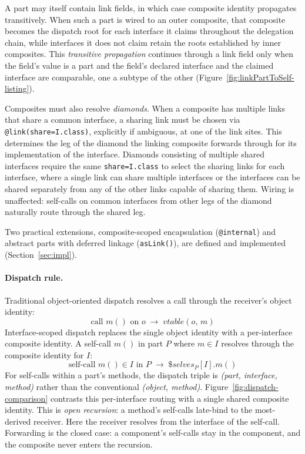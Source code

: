 \documentclass[acmsmall,nonacm]{acmart}
\theoremstyle{acmplain}
\newcommand{\code}[1]{\texttt{#1}}
\begin{document}
A part may itself contain link fields, in which case composite identity propagates transitively. When such a part is wired
to an outer composite, that composite becomes the dispatch root for each interface it claims throughout the delegation chain,
while interfaces it does not claim retain the roots established by inner composites. This \emph{transitive propagation}
continues through a link field only when the field's value is a part and the field's declared interface and the claimed
interface are comparable, one a subtype of the other (Figure~\ref{fig:linkPartToSelf-listing}).

Composites must also resolve \emph{diamonds}. When a composite has multiple links that share a common interface, a sharing
link must be chosen via \code{@link(share=I.class)}, explicitly if ambiguous, at one of the link sites. This determines the leg of the diamond the
linking composite forwards through for its implementation of the interface. Diamonds consisting of multiple shared interfaces require the same \code{share=I.class}
to select the sharing links for each interface, where a single link can share multiple interfaces or the interfaces
can be shared separately from any of the other links capable of sharing them. Wiring is unaffected: self-calls on common
interfaces from other legs of the diamond naturally route through the shared leg.

Two practical extensions, composite-scoped encapsulation (\code{@internal}) and abstract parts with deferred linkage (\code{asLink()}),
are defined and implemented (Section~\ref{sec:impl}).

\paragraph{Dispatch rule.}
Traditional object-oriented dispatch resolves a call through the receiver's object identity:
\[ \text{call } m() \text{ on } o \;\longrightarrow\; \mathit{vtable}(o,\, m) \]
Interface-scoped dispatch replaces the single object identity with a per-interface composite identity. A self-call $m()$
in part $P$ where $m \in I$ resolves through the composite identity for $I$:
\[ \text{self-call } m() \in I \text{ in } P \;\longrightarrow\; \$\mathit{selves}_P[I].m() \]
For self-calls within a part's methods, the dispatch triple is \emph{(part, interface, method)} rather than the conventional
\emph{(object, method)}.
Figure~\ref{fig:dispatch-comparison} contrasts this per-interface routing with a single shared composite identity. This is
\emph{open recursion}: a method's self-calls late-bind to the most-derived receiver. Here the receiver resolves from the
interface of the self-call. Forwarding is the closed case: a component's self-calls stay in the component, and the composite
never enters the recursion.
\end{document}
